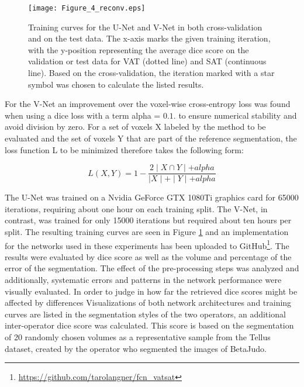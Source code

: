 \documentclass[10pt,letterpaper]{article}
\begin{document}
		\begin{figure}[H] %
			
			
			\texttt{[image: Figure\_4\_reconv.eps]}
			
			\caption{Training curves for the U-Net and V-Net in both cross-validation and on the test data. The x-axis marks the given training iteration, with the y-position representing the average dice score on the validation or test data for VAT (dotted line) and SAT (continuous line). Based on the cross-validation, the iteration marked with a star symbol was chosen to calculate the listed results.}
			
			\label{fig4} %
			
		\end{figure}	
		
		
		For the V-Net an improvement over the voxel-wise cross-entropy loss was found when using a dice loss with a term alpha = $0.1$. to ensure numerical stability and avoid division by zero. For a set of voxels X labeled by the method to be evaluated and the set of voxels Y that are part of the reference segmentation, the loss function L to be minimized therefore takes the following form:
		
		
		\begin{equation}L(X,Y)=1 - \frac{2 \mid X \cap Y \mid + alpha}{\mid X\mid +\mid Y \mid + alpha}
		\end{equation}
		\label{eq1}
			
	The U-Net was trained on a Nvidia GeForce GTX 1080Ti graphics card for 65000 iterations, requiring about one hour on each training split. The V-Net, in contrast, was trained for only 15000 iterations but required about ten hours per split. The resulting training curves are seen in Figure \ref{fig4} and an implementation for the networks used in these experiments has been uploaded to GitHub\footnote{\url{https://github.com/tarolangner/fcn_vatsat}}. The results were evaluated by dice score as well as the volume and percentage of the error of the segmentation. The effect of the pre-processing steps was analyzed and additionally, systematic errors and patterns in the network performance were visually evaluated. In order to judge in how far the retrieved dice scores might be affected by differences Visualizations of both network architectures and training curves are listed in the segmentation styles of the two operators, an additional inter-operator dice score was calculated. This score is based on the segmentation of 20 randomly chosen volumes as a representative sample from the Tellus dataset, created by the operator who segmented the images of BetaJudo.
	
\end{document}

